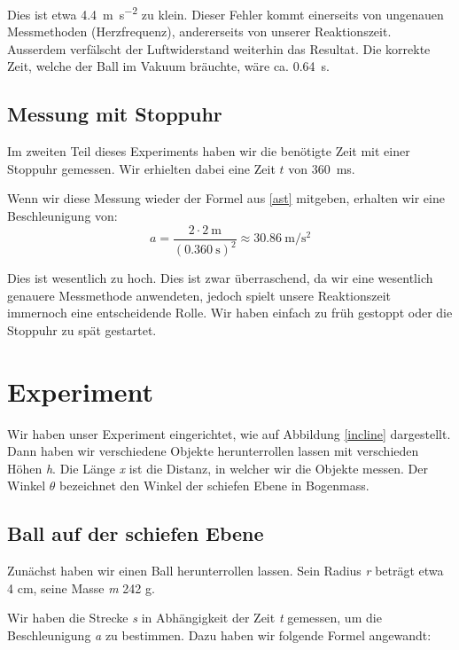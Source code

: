 \documentclass[a4paper, titlepage]{article}
\newcommand{\accunit}[1]{\SI{#1}{\metre\per\square\second}}
\begin{document}
    Dies ist etwa \accunit{4.4} zu klein. Dieser Fehler kommt
    einerseits von ungenauen Messmethoden (Herzfrequenz), andererseits
    von unserer Reaktionszeit. Ausserdem verfälscht der Luftwiderstand
    weiterhin das Resultat. Die korrekte Zeit, welche der Ball
    im Vakuum bräuchte, wäre ca. \SI{0.64}{\second}.

    \subsection{Messung mit Stoppuhr}
    Im zweiten Teil dieses Experiments haben wir die benötigte
    Zeit mit einer Stoppuhr gemessen. Wir erhielten dabei eine
    Zeit $t$ von \SI{360}{\milli\second}.

    Wenn wir diese Messung wieder der Formel aus \ref{ast}
    mitgeben, erhalten wir eine Beschleunigung von:
    \begin{equation}
        a = \frac{2 \cdot \SI{2}{\metre}}{(\SI{0.360}{\second})^2}
        \approx \accunit{30.86}
    \end{equation}
    
    Dies ist wesentlich zu hoch. Dies ist zwar überraschend, 
    da wir eine wesentlich genauere Messmethode anwendeten,
    jedoch spielt unsere Reaktionszeit immernoch eine entscheidende
    Rolle. Wir haben einfach zu früh gestoppt oder die Stoppuhr
    zu spät gestartet.





    \section{Experiment}
    Wir haben unser Experiment eingerichtet, wie auf Abbildung
    \ref{incline} dargestellt. Dann haben wir verschiedene Objekte
    herunterrollen lassen mit verschieden Höhen
    \emph{h}. Die Länge \emph{x} ist die Distanz, in welcher
    wir die Objekte messen. Der Winkel $\theta$ bezeichnet
    den Winkel der schiefen Ebene in Bogenmass.

    \subsection{Ball auf der schiefen Ebene}
    Zunächst haben wir einen Ball herunterrollen lassen.
    Sein Radius \emph{r} beträgt etwa 4 cm, seine Masse
    \emph{m} 242 g.
    
    Wir haben die Strecke \emph{s} in Abhängigkeit
    der Zeit \emph{t} gemessen, um die Beschleunigung
    \emph{a} zu bestimmen. Dazu haben wir folgende Formel
    angewandt:
\end{document}
